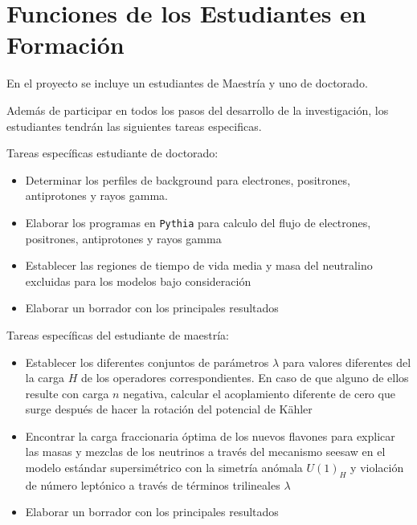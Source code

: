 \section{ Funciones de los Estudiantes en Formación }



En el proyecto se incluye un estudiantes de Maestría y uno de doctorado.

Además de participar en todos los pasos del desarrollo de la
investigación, los estudiantes  tendrán las siguientes
tareas especificas.

Tareas específicas estudiante de doctorado:
\begin{itemize}
\item Determinar los perfiles de background para electrones, positrones, antiprotones y rayos gamma.
\item Elaborar los programas en \texttt{Pythia} para calculo del flujo de electrones, positrones, antiprotones y rayos gamma
\item Establecer las regiones de tiempo de vida media y masa del neutralino excluidas para los modelos bajo consideración
\item Elaborar un borrador con los principales resultados
\end{itemize}

Tareas específicas del estudiante de maestría:
\begin{itemize}
\item Establecer los diferentes conjuntos de parámetros $\lambda$ para valores diferentes del la carga $H$ de los operadores correspondientes. En caso de que alguno de ellos resulte con carga $n$ negativa, calcular el acoplamiento diferente de cero que surge después de hacer la rotación del potencial de K\"ahler
\item Encontrar la carga fraccionaria óptima de los nuevos flavones para explicar las masas y mezclas de los neutrinos a través del mecanismo seesaw en el modelo estándar supersimétrico con la simetría anómala $U(1)_H$ y violación de número leptónico a través de términos trilineales $\lambda$
\item Elaborar un borrador con los principales resultados
\end{itemize}


